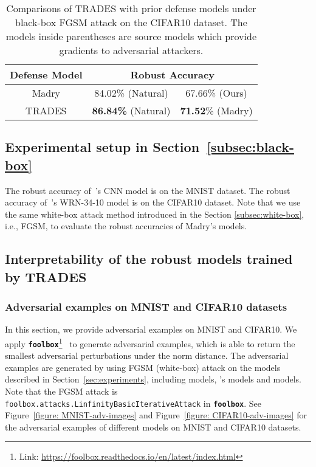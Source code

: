 \documentclass[11pt]{article}
\newcommand{\0}{\mathbf{0}}
\newcommand{\1}{\mathbf{1}}
\begin{document}
\begin{table*}[ht]
	\caption{Comparisons of TRADES with prior defense models under black-box FGSM attack on the CIFAR10 dataset. The models inside parentheses are source models which provide gradients to adversarial attackers.}
	\label{table: CIFAR10 FGSM black-box defense}
	\centering
\begin{tabular}{c||c|c}\hline
Defense Model & \multicolumn{2}{c}{Robust Accuracy }
		\\
		\hline
		{Madry} & 84.02\% (Natural)  & 67.66\% (Ours) \\ 
		\hline
		{TRADES} & \textbf{86.84\%} (Natural) & \textbf{71.52}\% (Madry)  \\
		\hline
\end{tabular}
\end{table*}


\subsection{Experimental setup in Section~\ref{subsec:black-box}}
The robust accuracy of~\cite{madry2018towards}'s CNN model is  on the MNIST dataset. The robust accuracy of~\cite{madry2018towards}'s WRN-34-10 model is  on the CIFAR10 dataset. Note that we use the same white-box attack method introduced in the Section \ref{subsec:white-box}, i.e., FGSM,  to evaluate the robust accuracies of Madry's models.

\subsection{Interpretability of the robust models trained by TRADES}

\subsubsection{Adversarial examples on MNIST and CIFAR10 datasets}
In this section, we provide adversarial examples on MNIST and CIFAR10. We apply \textbf{\texttt{foolbox}}\footnote{Link: \url{https://foolbox.readthedocs.io/en/latest/index.html}}~\cite{rauber2017foolbox} to generate adversarial examples, which is able to return the smallest adversarial perturbations under the  norm distance. The adversarial examples are generated by using FGSM (white-box) attack on the models described in Section~\ref{sec:experiments}, including  models, 's models and  models. Note that the FGSM attack is \texttt{foolbox.attacks.LinfinityBasicIterativeAttack} in \textbf{\texttt{foolbox}}. See Figure~\ref{figure: MNIST-adv-images} and Figure~\ref{figure: CIFAR10-adv-images} for the adversarial examples of different models on  MNIST and CIFAR10 datasets.
\end{document}
